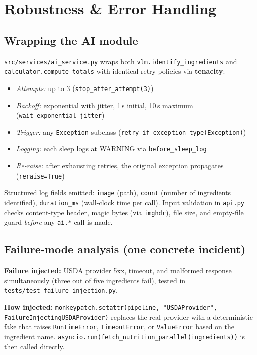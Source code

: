 \documentclass[11pt,a4paper]{article}
\begin{document}
\section{Robustness \& Error Handling}\label{sec:robustness}

\subsection{Wrapping the AI module}

\texttt{src/services/ai\_service.py} wraps both \texttt{vlm.identify\_ingredients} and \texttt{calculator.compute\_totals} with identical retry policies via \textbf{tenacity}:
\begin{itemize}[nosep]
  \item \textit{Attempts:} up to 3 (\texttt{stop\_after\_attempt(3)})
  \item \textit{Backoff:} exponential with jitter, 1\,s initial, 10\,s maximum (\texttt{wait\_exponential\_jitter})
  \item \textit{Trigger:} any \texttt{Exception} subclass (\texttt{retry\_if\_exception\_type(Exception)})
  \item \textit{Logging:} each sleep logs at WARNING via \texttt{before\_sleep\_log}
  \item \textit{Re-raise:} after exhausting retries, the original exception propagates (\texttt{reraise=True})
\end{itemize}
Structured log fields emitted: \texttt{image} (path), \texttt{count} (number of ingredients identified), \texttt{duration\_ms} (wall-clock time per call). Input validation in \texttt{api.py} checks content-type header, magic bytes (via \texttt{imghdr}), file size, and empty-file guard \textit{before} any \texttt{ai.*} call is made.

\subsection{Failure-mode analysis (one concrete incident)}

\textbf{Failure injected:} USDA provider 5xx, timeout, and malformed response simultaneously (three out of five ingredients fail), tested in \texttt{tests/test\_failure\_injection.py}.

\textbf{How injected:} \texttt{monkeypatch.setattr(pipeline, "USDAProvider", FailureInjectingUSDAProvider)} replaces the real provider with a deterministic fake that raises \texttt{RuntimeError}, \texttt{TimeoutError}, or \texttt{ValueError} based on the ingredient name. \texttt{asyncio.run(fetch\_nutrition\_parallel(ingredients))} is then called directly.
\end{document}
